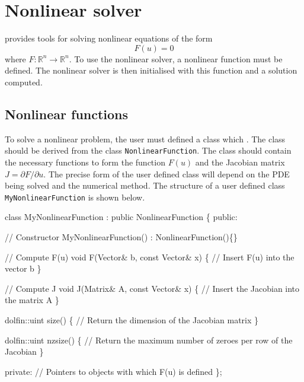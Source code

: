 \chapter{Nonlinear solver}


\dolfin{} provides tools for solving nonlinear equations of the form
\begin{equation}
  F(u) = 0
\end{equation}
where $F: \mathbb{R}^{n} \rightarrow \mathbb{R}^{n}$. 
To use the nonlinear solver, a nonlinear function must be defined. 
The nonlinear solver is then initialised with this function and a 
solution computed.



\section{Nonlinear functions}

To solve a nonlinear problem, the user must defined a class which . The class 
should be derived from the \dolfin class \texttt{NonlinearFunction}. The class 
should contain the necessary functions to form the function $F(u)$ and the 
Jacobian matrix  $J = \partial F / \partial u$. The precise form of the user 
defined class will depend on the PDE being solved and the numerical method.
The structure of a user defined class \texttt{MyNonlinearFunction} is shown below.
\begin{code}
class MyNonlinearFunction : public NonlinearFunction
\{
  public: 
  
    // Constructor 
    MyNonlinearFunction() : NonlinearFunction()\{\}
  
    // Compute F(u) 
    void F(Vector\& b, const Vector\& x)
    \{
      // Insert F(u) into the vector b 
    \}

    // Compute J
    void J(Matrix\& A, const Vector\& x)
    \{
      // Insert the Jacobian into the matrix A 
    \}

    dolfin::uint size()
    \{      
      // Return the dimension of the Jacobian matrix 
    \}

    dolfin::uint nzsize()
    \{      
      // Return the maximum number of zeroes per row of the Jacobian
    \}

  private:
    // Pointers to objects with which F(u) is defined
\};
\end{code}


